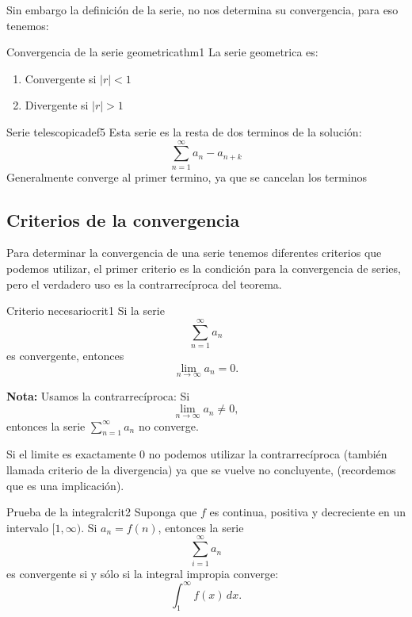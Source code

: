 Sin embargo la definición de la serie, no nos determina su convergencia, para eso tenemos:

\begin{teorema}{Convergencia de la serie geometrica}{thm1}
    La serie geometrica es: 
    \begin{enumerate}
        \item Convergente si $|r| < 1$
        \item Divergente si $|r| > 1$
    \end{enumerate}
\end{teorema}

\begin{definicion}{Serie telescopica}{def5}
    Esta serie es la resta de dos terminos de la solución:
    \[ 
        \sum_{n = 1}^{\infty} a_n - a_{n + k} 
    \]
    Generalmente converge al primer termino, ya que se cancelan los terminos
\end{definicion} 

\subsection{Criterios de la convergencia}
Para determinar la convergencia de una serie tenemos diferentes criterios que podemos utilizar, el primer criterio es la condición para la convergencia de series, pero el verdadero uso es la contrarrecíproca del teorema.
\begin{teorema}{Criterio necesario}{crit1}
    Si la serie 
    \[
        \sum_{n=1}^{\infty} a_n
    \]
    es convergente, entonces 
    \[
        \lim_{n \to \infty} a_n = 0.
    \]

    \textbf{Nota:} Usamos la contrarrecíproca:  
    Si 
    \[
        \lim_{n \to \infty} a_n \neq 0,
    \]
    entonces la serie 
    \(\sum_{n=1}^{\infty} a_n\) no converge.
\end{teorema}

\begin{nota}
    Si el limite es exactamente $0$ no podemos utilizar la contrarrecíproca (también llamada criterio de la divergencia) ya que se vuelve no concluyente, (recordemos que es una implicación). 
\end{nota}

\begin{teorema}{Prueba de la integral}{crit2}
    Suponga que $f$ es continua, positiva y decreciente en un intervalo $[1, \infty)$.  
    Si $a_n = f(n)$, entonces la serie
    \[
        \sum_{i=1}^{\infty} a_n
    \]
    es convergente si y sólo si la integral impropia converge:
    \[
        \int_{1}^{\infty} f(x)\,dx.
    \]
\end{teorema}

